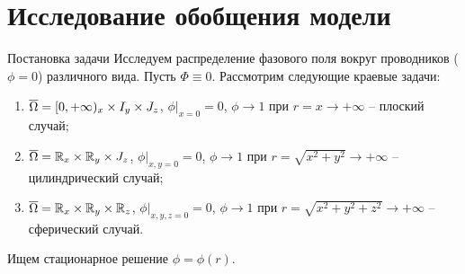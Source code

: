 
\section{Исследование обобщения модели}

\begin{frame}{Постановка задачи}
Исследуем распределение фазового поля вокруг проводников ($\phi = 0$) различного вида. Пусть $\Phi \equiv 0$. Рассмотрим следующие краевые задачи:
\begin{enumerate}
	\item ${\overline{\Omega}} = [0, +\infty)_x \times I_y \times J_z$, $\phi|_{x = 0} = 0$, $\phi \to 1$ при $r = x \to +\infty$ -- плоский случай;
	\item ${\overline{\Omega}} = \mathbb{R}_x \times \mathbb{R}_y \times J_z$, $\phi|_{x, y = 0} = 0$, $\phi \to 1$ при $r = \sqrt{x^2 + y^2} \to +\infty$ -- \\ цилиндрический случай;
	\item ${\overline{\Omega}} = \mathbb{R}_x \times \mathbb{R}_y \times \mathbb{R}_z$, $\phi|_{x, y, z = 0} = 0$, $\phi \to 1$ при $r = \sqrt{x^2 + y^2 + z^2} \to +\infty$ -- \\ сферический случай.
\end{enumerate}
Ищем стационарное решение $\phi = \phi(r)$.
\end{frame}


